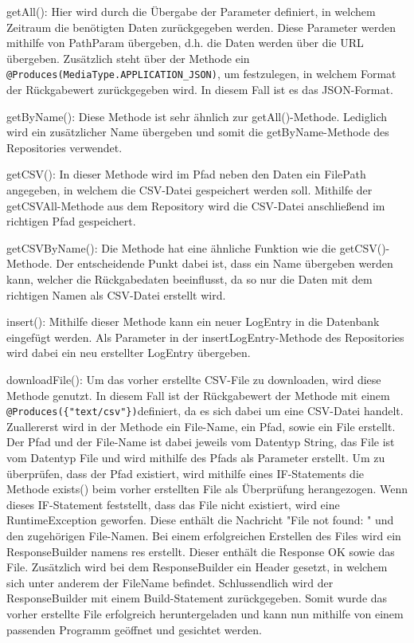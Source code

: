\begin{compactitem}
    \item getAll(): Hier wird durch die Übergabe der Parameter definiert, in welchem Zeitraum die benötigten Daten zurückgegeben werden. Diese Parameter werden mithilfe von PathParam übergeben, d.h. die Daten werden über die URL übergeben. Zusätzlich steht über der Methode ein \texttt{@Produces(MediaType.APPLICATION\_JSON)}, um festzulegen, in welchem Format der Rückgabewert zurückgegeben wird. In diesem Fall ist es das JSON-Format.
    \item getByName(): Diese Methode ist sehr ähnlich zur getAll()-Methode. Lediglich wird ein zusätzlicher Name übergeben und somit die getByName-Methode des Repositories verwendet. 
    \item getCSV(): In dieser Methode wird im Pfad neben den Daten ein FilePath angegeben, in welchem die CSV-Datei gespeichert werden soll. Mithilfe der getCSVAll-Methode aus dem Repository wird die CSV-Datei anschließend im richtigen Pfad gespeichert. 
    \item getCSVByName(): Die Methode hat eine ähnliche Funktion wie die getCSV()-Methode. Der entscheidende Punkt dabei ist, dass ein Name übergeben werden kann, welcher die Rückgabedaten beeinflusst, da so nur die Daten mit dem richtigen Namen als CSV-Datei erstellt wird.  
    \item insert(): Mithilfe dieser Methode kann ein neuer LogEntry in die Datenbank eingefügt werden. Als Parameter in der insertLogEntry-Methode des Repositories wird dabei ein neu erstellter LogEntry übergeben.
    \item downloadFile(): Um das vorher erstellte CSV-File zu downloaden, wird diese Methode genutzt. In diesem Fall ist der Rückgabewert der Methode mit einem \texttt{@Produces(\{"text/csv"\})}definiert, da es sich dabei um eine CSV-Datei handelt. Zuallererst wird in der Methode ein File-Name, ein Pfad, sowie ein File erstellt. Der Pfad und der File-Name ist dabei jeweils vom Datentyp String, das File ist vom Datentyp File und wird mithilfe des Pfads als Parameter erstellt. Um zu überprüfen, dass der Pfad existiert, wird mithilfe eines IF-Statements die Methode exists() beim vorher erstellten File als Überprüfung herangezogen. Wenn dieses IF-Statement feststellt, dass das File nicht existiert, wird eine RuntimeException geworfen. Diese enthält die Nachricht "File not found: " und den zugehörigen File-Namen. Bei einem erfolgreichen Erstellen des Files wird ein ResponseBuilder namens res erstellt. Dieser enthält die Response OK sowie das File. Zusätzlich wird bei dem ResponseBuilder ein Header gesetzt, in welchem sich unter anderem der FileName befindet. Schlussendlich wird der ResponseBuilder mit einem Build-Statement zurückgegeben. Somit wurde das vorher erstellte File erfolgreich heruntergeladen und kann nun mithilfe von einem passenden Programm geöffnet und gesichtet werden.
\end{compactitem}

